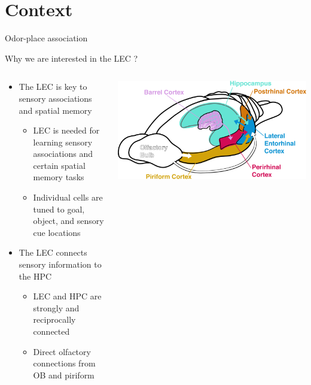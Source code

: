\documentclass[bigger]{beamer}
\begin{document}
\section*{Context}
\label{sec:org0d37e46}
{%
\begin{frame}[fragile]{Odor-place association}
\addtocounter{framenumber}{-1}
\end{frame}
}
\begin{frame}[label={sec:org5c53190}]{Why we are interested in the LEC ?}
\begin{columns}
\begin{column}{0.5\columnwidth}
\pause
\scriptsize
\footnotesize
\begin{itemize}[<+->]
\item The LEC is key to sensory associations and spatial memory
\begin{itemize}
\scriptsize
\item LEC is needed for learning sensory associations and certain spatial memory tasks
\item Individual cells are tuned to goal, object, and sensory cue locations
\end{itemize}
\item The LEC connects sensory information to the HPC
\begin{itemize}
\scriptsize
\item LEC and HPC are strongly and reciprocally connected
\item Direct olfactory connections from OB and piriform
\end{itemize}
\end{itemize}
\end{column}
\begin{column}{0.5\columnwidth}
\begin{center}
\includegraphics[width=\textwidth]{img/connectivity.png}
\end{center}
\end{column}
\end{columns}
\end{frame}
\end{document}
